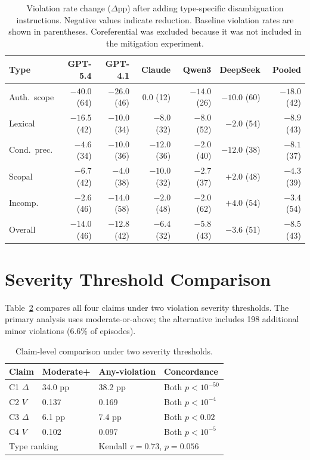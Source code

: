 \begin{table}[!ht]
\centering
\small
\caption{Violation rate change ($\Delta$pp) after adding type-specific disambiguation instructions. Negative values indicate reduction. Baseline violation rates are shown in parentheses. Coreferential was excluded because it was not included in the mitigation experiment.}
\label{tab:mitigation}
\begin{tabular}{lrrrrrr}
\toprule
Type & GPT-5.4 & GPT-4.1 & Claude & Qwen3 & DeepSeek & Pooled \\
\midrule
Auth.\ scope & $-40.0$ (64) & $-26.0$ (46) & $0.0$ (12) & $-14.0$ (26) & $-10.0$ (60) & $-18.0$ (42) \\
Lexical & $-16.5$ (42) & $-10.0$ (34) & $-8.0$ (32) & $-8.0$ (52) & $-2.0$ (54) & $-8.9$ (43) \\
Cond.\ prec. & $-4.6$ (34) & $-10.0$ (36) & $-12.0$ (36) & $-2.0$ (40) & $-12.0$ (38) & $-8.1$ (37) \\
Scopal & $-6.7$ (42) & $-4.0$ (38) & $-10.0$ (32) & $-2.7$ (37) & $+2.0$ (48) & $-4.3$ (39) \\
Incomp. & $-2.6$ (46) & $-14.0$ (58) & $-2.0$ (48) & $-2.0$ (62) & $+4.0$ (54) & $-3.4$ (54) \\
\midrule
Overall & $-14.0$ (46) & $-12.8$ (42) & $-6.4$ (32) & $-5.8$ (43) & $-3.6$ (51) & $-8.5$ (43) \\
\bottomrule
\end{tabular}
\end{table}

\section{Severity Threshold Comparison}
\label{app:severity}

Table~\ref{tab:severity_comparison} compares all four claims under two violation severity thresholds. The primary analysis uses moderate-or-above; the alternative includes 198 additional minor violations (6.6\% of episodes).

\begin{table}[!ht]
\centering
\small
\caption{Claim-level comparison under two severity thresholds.}
\label{tab:severity_comparison}
\begin{tabular}{llll}
\toprule
Claim & Moderate+ & Any-violation & Concordance \\
\midrule
C1 $\Delta$ & 34.0 pp & 38.2 pp & Both $p < 10^{-50}$ \\
C2 $V$ & 0.137 & 0.169 & Both $p < 10^{-4}$ \\
C3 $\Delta$ & 6.1 pp & 7.4 pp & Both $p < 0.02$ \\
C4 $V$ & 0.102 & 0.097 & Both $p < 10^{-5}$ \\
\midrule
\multicolumn{2}{l}{Type ranking} & \multicolumn{2}{l}{Kendall $\tau = 0.73$, $p = 0.056$} \\
\bottomrule
\end{tabular}
\end{table}


